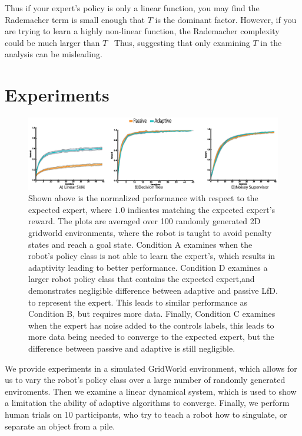 \documentclass[10pt, conference]{ieeeconf}      %
\begin{document}
Thus if your expert's policy is only a linear function, you may find the Rademacher term is small enough that $T$ is the dominant factor. However, if you are trying to learn a highly non-linear function, the Rademacher complexity could be much larger than $T$~\cite{vapnik2013nature} Thus, suggesting that only examining $T$ in the analysis can be misleading. 


\section{Experiments}

\begin{figure}
\includegraphics{f_figs/var_grid.eps}
\caption{
    \footnotesize
Shown above is the normalized performance with respect to the expected expert, where $1.0$ indicates matching the expected expert's reward. The plots are averaged over 100 randomly generated 2D gridworld environments,  where the robot is taught to avoid penalty states and reach a goal state. Condition A examines when the robot's policy class is not able to learn the expert's, which results in adaptivity leading to better performance. Condition D examines a larger robot policy class that contains the expected expert,and demonstrates negligible difference between adaptive and passive LfD.  to represent the expert. This leads to similar performance as Condition B, but requires more data. Finally, Condition C examines when the expert has noise added to the controls labels, this leads to more data being needed to converge to the expected expert, but the difference between passive and adaptive is still negligible.   }
\vspace*{-20pt}
\label{fig:var}
\end{figure}

We provide experiments in a simulated GridWorld environment, which allows for us to vary the robot's policy class over a large number of randomly generated enviroments. Then we examine a linear dynamical system, which is used to show a limitation the ability of adaptive algorithms to converge. Finally, we perform human trials on 10 participants, who try to teach a robot how to singulate, or separate an object from a pile. 
\end{document}
